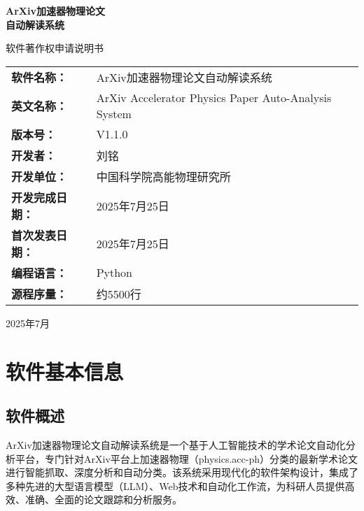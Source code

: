 \documentclass[12pt,a4paper]{article}
\begin{document}
\begin{titlepage}
    \centering
    \vspace*{3cm}
    
    {\Huge\bfseries ArXiv加速器物理论文\\自动解读系统}
    
    \vspace{0.5cm}
    {\Large 软件著作权申请说明书}
    
    \vspace{2cm}
    
    \begin{tabular}{ll}
        \textbf{软件名称：} & ArXiv加速器物理论文自动解读系统 \\[0.3cm]
        \textbf{英文名称：} & ArXiv Accelerator Physics Paper Auto-Analysis System \\[0.3cm]
        \textbf{版本号：} & V1.1.0 \\[0.3cm]
        \textbf{开发者：} & 刘铭 \\[0.3cm]
        \textbf{开发单位：} & 中国科学院高能物理研究所 \\[0.3cm]
        \textbf{开发完成日期：} & 2025年7月25日 \\[0.3cm]
        \textbf{首次发表日期：} & 2025年7月25日 \\[0.3cm]
        \textbf{编程语言：} & Python \\[0.3cm]
        \textbf{源程序量：} & 约5500行 \\[0.3cm]
    \end{tabular}
    
    \vfill
    
    {\large 2025年7月}
\end{titlepage}

\newpage
\tableofcontents
\newpage

\section{软件基本信息}

\subsection{软件概述}
ArXiv加速器物理论文自动解读系统是一个基于人工智能技术的学术论文自动化分析平台，专门针对ArXiv平台上加速器物理（physics.acc-ph）分类的最新学术论文进行智能抓取、深度分析和自动分类。该系统采用现代化的软件架构设计，集成了多种先进的大型语言模型（LLM）、Web技术和自动化工作流，为科研人员提供高效、准确、全面的论文跟踪和分析服务。
\end{document}
